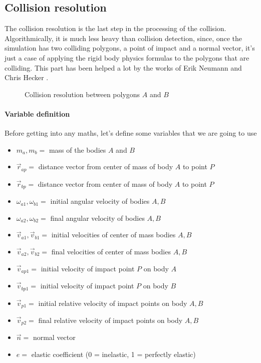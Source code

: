 \subsection{Collision resolution}
\label{sub:resolution}

The collision resolution is the last step in the processing of the collision.
Algorithmically, it is much less heavy than collision detection, since, once the
simulation has two colliding polygons, a point of impact and a normal vector,
it's just a case of applying the rigid body physics formulas to the polygons
that are colliding. This part has been helped a lot by the works of Erik Neumann
\cite{collision:resolution-site} and Chris Hecker
\cite{collision:resolution-paper}.

\begin{figure}[H]
	\centering
	\caption{Collision resolution between polygons $A$ and $B$}
	\label{fig:collision_resolution}
\end{figure}

\paragraph{Variable definition} Before getting into any maths, let's define some
variables that we are going to use

\begin{multicols}{2}
	\begin{itemize}
		\item $m_a, m_b = $ mass of the bodies $A$ and $B$
		\item $\vec r_{ap} = $ distance vector from center of mass of body $A$ to
		      point $P$
		\item $\vec r_{bp} = $ distance vector from center of mass of body $A$ to
		      point $P$
		\item $\omega_{a1}, \omega_{b1} = $ initial angular velocity of bodies
		      $A, B$
		\item $\omega_{a2}, \omega_{b2} = $ final angular velocity of bodies
		      $A, B$
		\item $\vec v_{a1}, \vec v_{b1} =$ initial velocities of center of mass
		      bodies $A, B$
		\item $\vec v_{a2}, \vec v_{b2} =$ final velocities of center of mass
		      bodies $A, B$
		\item $\vec v_{ap1}=$ initial velocity of impact point $P$ on body $A$
		\item $\vec v_{bp1}=$ initial velocity of impact point $P$ on body $B$
		\item $\vec v_{p1}=$ initial relative velocity of impact points on body $A, B$
		\item $\vec v_{p2}=$ final relative velocity of impact points on body $A, B$
		\item $\vec n=$ normal vector
		\item $ e=$ elastic coefficient (0 = inelastic, 1 = perfectly elastic)
	\end{itemize}
\end{multicols}

